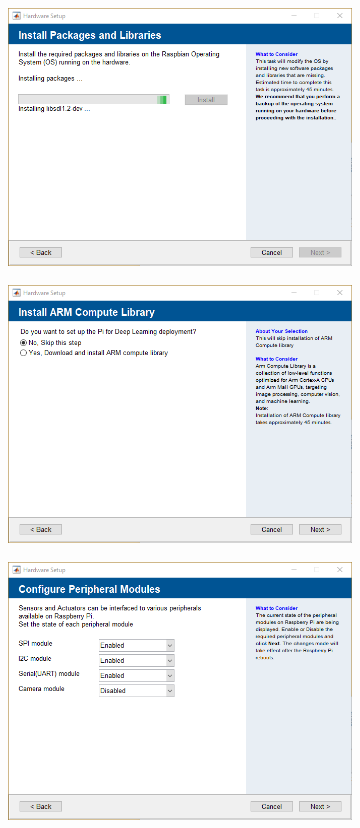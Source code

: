 \begin{figure}[ht]
\begin{subfigure}{.3\textwidth}
		\includegraphics[width=.9\linewidth]{Pictures/Connect RPi 06.png}  
		\caption{}
		\label{fig:sub-fifth}
	\end{subfigure}
	\begin{subfigure}{.3\textwidth}
		\centering
		\includegraphics[width=.9\linewidth]{Pictures/Connect RPi 08.png}  
		\caption{}
		\label{fig:sub-sixth}
	\end{subfigure}
	\newline
	\begin{subfigure}{.3\textwidth}
		\centering
		\includegraphics[width=.9\linewidth]{Pictures/Connect RPi 09.png}  

\end{subfigure}
\end{figure}
